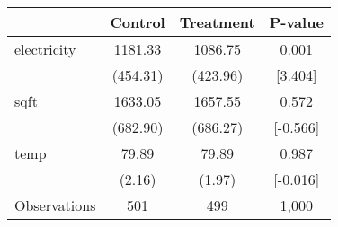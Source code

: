 {
\def\sym#1{\ifmmode^{#1}\else\(^{#1}\)\fi}
\begin{tabular}{l*{3}{c}}
\hline\hline
            &\multicolumn{1}{c}{Control}&\multicolumn{1}{c}{Treatment}&\multicolumn{1}{c}{P-value}\\
\hline
electricity &    1181.33 &    1086.75 &       0.001\\
            &   (454.31) &   (423.96) &     [3.404]\\
sqft        &    1633.05 &    1657.55 &       0.572\\
            &   (682.90) &   (686.27) &    [-0.566]\\
temp        &      79.89 &      79.89 &       0.987\\
            &     (2.16) &     (1.97) &    [-0.016]\\
\hline
Observations&         501&         499&       1,000\\
\hline\hline
\end{tabular}
}
